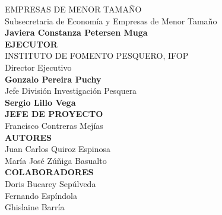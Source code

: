 \documentclass[12pt, oneside]{article} %
\begin{document}
\begin{titlepage}
\begin{minipage}{\textwidth}
\begin{flushright}
 EMPRESAS DE MENOR TAMAÑO \\ 
 \vspace*{5mm} 
  Subsecretaria de Economía y Empresas de Menor Tamaño\\
 \textbf{Javiera Constanza Petersen Muga} \\
 \vspace*{5mm} 
 \textbf{EJECUTOR} \\ 
 INSTITUTO DE FOMENTO PESQUERO, IFOP\\
 \vspace*{4mm} 
 Director Ejecutivo   
 \\ \textbf{Gonzalo Pereira Puchy} \\
 \vspace*{4mm} 
 Jefe  División Investigación Pesquera   
 \\ \textbf{Sergio Lillo Vega} \\
 \vspace*{8mm} 
 \fontsize{9pt}{8pt}\selectfont
 \textbf{JEFE DE PROYECTO}   \\
 Francisco Contreras Mejías \\
 \vspace*{8mm} 
 \textbf{AUTORES}   \\
 Juan Carlos Quiroz Espinosa \\
 María José Zúñiga Basualto \\ 
  \vspace*{8mm} 
 \textbf{COLABORADORES}   \\
 Doris Bucarey Sepúlveda \\
 Fernando Espíndola \\
 Ghislaine Barría
 \end{flushright} 
\end{minipage}
\vfill
\end{titlepage}

\end{document}
